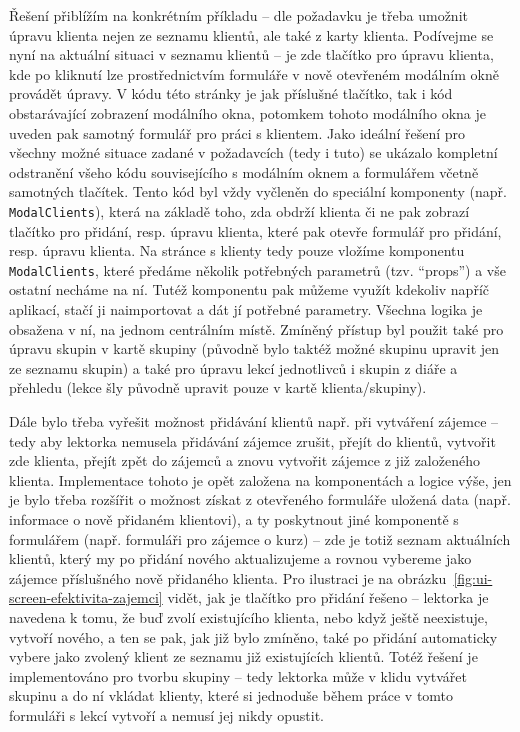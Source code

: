 Řešení přiblížím na konkrétním příkladu -- dle požadavku je třeba umožnit úpravu klienta nejen ze seznamu klientů, ale také z karty klienta. Podívejme se nyní na aktuální situaci v seznamu klientů -- je zde tlačítko pro úpravu klienta, kde po kliknutí lze prostřednictvím formuláře v nově otevřeném modálním okně provádět úpravy. V kódu této stránky je jak příslušné tlačítko, tak i kód obstarávající zobrazení modálního okna, potomkem tohoto modálního okna je uveden pak samotný formulář pro práci s klientem. Jako ideální řešení pro všechny možné situace zadané v požadavcích (tedy i tuto) se ukázalo kompletní odstranění všeho kódu souvisejícího s modálním oknem a formulářem včetně samotných tlačítek. Tento kód byl vždy vyčleněn do speciální komponenty (např. \verb|ModalClients|), která na základě toho, zda obdrží klienta či ne pak zobrazí tlačítko pro přidání, resp. úpravu klienta, které pak otevře formulář pro přidání, resp. úpravu klienta. Na stránce s klienty tedy pouze vložíme komponentu \verb|ModalClients|, které předáme několik potřebných parametrů (tzv. \enquote{props}) a vše ostatní necháme na ní. Tutéž komponentu pak můžeme využít kdekoliv napříč aplikací, stačí ji naimportovat a dát jí potřebné parametry. Všechna logika je obsažena v ní, na jednom centrálním místě. Zmíněný přístup byl použit také pro úpravu skupin v kartě skupiny (původně bylo taktéž možné skupinu upravit jen ze seznamu skupin) a také pro úpravu lekcí jednotlivců i skupin z diáře a přehledu (lekce šly původně upravit pouze v kartě klienta/skupiny). 

Dále bylo třeba vyřešit možnost přidávání klientů např. při vytváření zájemce -- tedy aby lektorka nemusela přidávání zájemce zrušit, přejít do klientů, vytvořit zde klienta, přejít zpět do zájemců a znovu vytvořit zájemce z již založeného klienta. Implementace tohoto je opět založena na komponentách a logice výše, jen je bylo třeba rozšířit o možnost získat z otevřeného formuláře uložená data (např. informace o nově přidaném klientovi), a ty poskytnout jiné komponentě s formulářem (např. formuláři pro zájemce o kurz) -- zde je totiž seznam aktuálních klientů, který my po přidání nového aktualizujeme a rovnou vybereme jako zájemce příslušného nově přidaného klienta. Pro ilustraci je na obrázku~\ref{fig:ui-screen-efektivita-zajemci} vidět, jak je tlačítko pro přidání řešeno -- lektorka je navedena k tomu, že buď zvolí existujícího klienta, nebo když ještě neexistuje, vytvoří nového, a ten se pak, jak již bylo zmíněno, také po přidání automaticky vybere jako zvolený klient ze seznamu již existujících klientů. Totéž řešení je implementováno pro tvorbu skupiny -- tedy lektorka může v klidu vytvářet skupinu a do ní vkládat klienty, které si jednoduše během práce v tomto formuláři s lekcí vytvoří a nemusí jej nikdy opustit.

